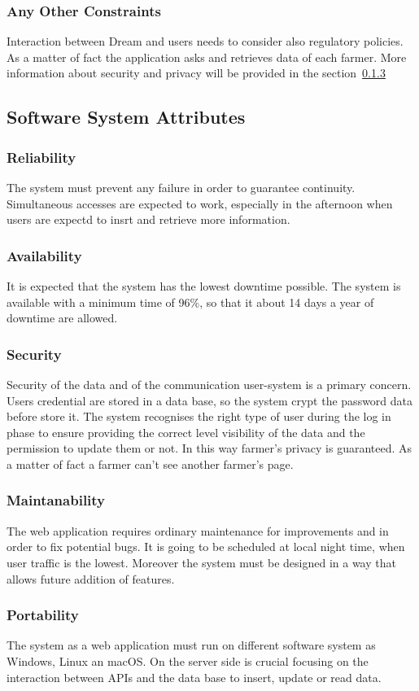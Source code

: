\subsubsection{Any Other Constraints}
Interaction between Dream and users needs to consider also regulatory policies.
As a matter of fact the application asks and retrieves data of each farmer.
More information about security and privacy will be provided in the section~\ref{subsubsection:3.4.3}


\subsection{Software System Attributes}

\subsubsection{Reliability}
The system must prevent any failure in order to guarantee continuity. 
Simultaneous accesses are expected to work, especially in the afternoon when users are expectd to insrt and retrieve more information.

\subsubsection{Availability}
It is expected that the system has the lowest downtime possible. 
The system is available with a minimum time of 96\%, 
so that it about 14 days a year of downtime are allowed.


\subsubsection{Security}
\label{subsubsection:3.4.3}
Security of the data and of the communication user-system is a primary concern. Users credential are stored in a data base, so the system crypt the password data before store it. The system recognises the right type of user during the log in phase to ensure providing the correct level visibility of the data and the permission to update them or not. In this way farmer’s privacy is guaranteed. As a matter of fact a farmer can’t see another farmer’s page.


\subsubsection{Maintanability}
The web application requires ordinary maintenance for improvements and in order to fix potential bugs. 
It is going to be scheduled at local night time, when user traffic is the lowest.
Moreover the system must be designed in a way that allows future addition of features.

\subsubsection{Portability}
The system as a web application must run on different software system as Windows, Linux an macOS.
On the server side is crucial focusing on the interaction between APIs and the data base to insert, update or read data.

